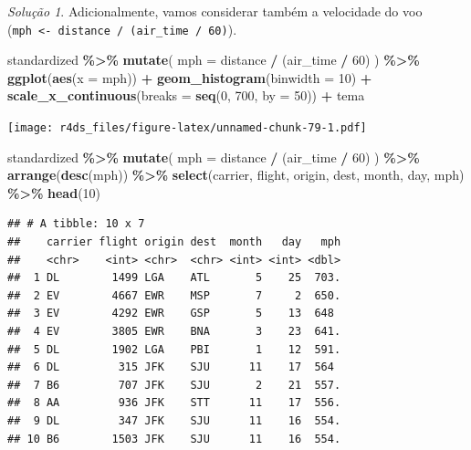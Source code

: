 \documentclass[
]{latex/krantz}
\newenvironment{Shaded}{\begin{snugshade}}{\end{snugshade}}
\newcommand{\AttributeTok}[1]{\textcolor[rgb]{0.13,0.29,0.53}{#1}}
\newcommand{\DecValTok}[1]{\textcolor[rgb]{0.00,0.00,0.81}{#1}}
\newcommand{\FunctionTok}[1]{\textcolor[rgb]{0.13,0.29,0.53}{\textbf{#1}}}
\newcommand{\NormalTok}[1]{#1}
\newcommand{\SpecialCharTok}[1]{\textcolor[rgb]{0.81,0.36,0.00}{\textbf{#1}}}
\theoremstyle{definition}
\theoremstyle{definition}
\theoremstyle{definition}
\theoremstyle{definition}
\theoremstyle{remark}
\newtheorem*{solution}{Solução}
\begin{document}
\begin{solution}
Adicionalmente, vamos considerar também a velocidade do voo (\texttt{mph\ \textless{}-\ distance\ /\ (air\_time\ /\ 60)}).

\begin{Shaded}
\begin{Highlighting}[]
\NormalTok{standardized }\SpecialCharTok{\%\textgreater{}\%}
    \FunctionTok{mutate}\NormalTok{(}
        \AttributeTok{mph =}\NormalTok{ distance }\SpecialCharTok{/}\NormalTok{ (air\_time }\SpecialCharTok{/} \DecValTok{60}\NormalTok{)}
\NormalTok{    ) }\SpecialCharTok{\%\textgreater{}\%}
    \FunctionTok{ggplot}\NormalTok{(}\FunctionTok{aes}\NormalTok{(}\AttributeTok{x =}\NormalTok{ mph)) }\SpecialCharTok{+}
        \FunctionTok{geom\_histogram}\NormalTok{(}\AttributeTok{binwidth =} \DecValTok{10}\NormalTok{) }\SpecialCharTok{+}
        \FunctionTok{scale\_x\_continuous}\NormalTok{(}\AttributeTok{breaks =} \FunctionTok{seq}\NormalTok{(}\DecValTok{0}\NormalTok{, }\DecValTok{700}\NormalTok{, }\AttributeTok{by =} \DecValTok{50}\NormalTok{)) }\SpecialCharTok{+}
\NormalTok{        tema}
\end{Highlighting}
\end{Shaded}

\texttt{[image: r4ds\_files/figure-latex/unnamed-chunk-79-1.pdf]}

\begin{Shaded}
\begin{Highlighting}[]
\NormalTok{standardized }\SpecialCharTok{\%\textgreater{}\%}
    \FunctionTok{mutate}\NormalTok{(}
        \AttributeTok{mph =}\NormalTok{ distance }\SpecialCharTok{/}\NormalTok{ (air\_time }\SpecialCharTok{/} \DecValTok{60}\NormalTok{)}
\NormalTok{    ) }\SpecialCharTok{\%\textgreater{}\%}
    \FunctionTok{arrange}\NormalTok{(}\FunctionTok{desc}\NormalTok{(mph)) }\SpecialCharTok{\%\textgreater{}\%}
    \FunctionTok{select}\NormalTok{(carrier, flight, origin, dest, month, day, mph) }\SpecialCharTok{\%\textgreater{}\%}
    \FunctionTok{head}\NormalTok{(}\DecValTok{10}\NormalTok{)}
\end{Highlighting}
\end{Shaded}

\begin{verbatim}
## # A tibble: 10 x 7
##    carrier flight origin dest  month   day   mph
##    <chr>    <int> <chr>  <chr> <int> <int> <dbl>
##  1 DL        1499 LGA    ATL       5    25  703.
##  2 EV        4667 EWR    MSP       7     2  650.
##  3 EV        4292 EWR    GSP       5    13  648 
##  4 EV        3805 EWR    BNA       3    23  641.
##  5 DL        1902 LGA    PBI       1    12  591.
##  6 DL         315 JFK    SJU      11    17  564 
##  7 B6         707 JFK    SJU       2    21  557.
##  8 AA         936 JFK    STT      11    17  556.
##  9 DL         347 JFK    SJU      11    16  554.
## 10 B6        1503 JFK    SJU      11    16  554.
\end{verbatim}


\end{solution}
\end{document}
